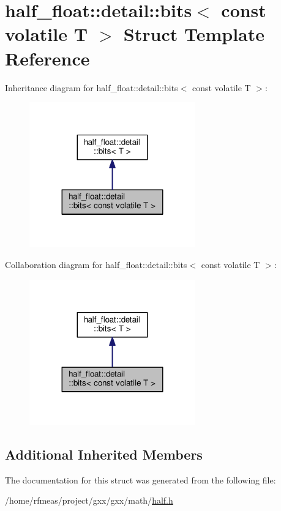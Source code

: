 \hypertarget{structhalf__float_1_1detail_1_1bits_3_01const_01volatile_01T_01_4}{}\section{half\+\_\+float\+:\+:detail\+:\+:bits$<$ const volatile T $>$ Struct Template Reference}
\label{structhalf__float_1_1detail_1_1bits_3_01const_01volatile_01T_01_4}


Inheritance diagram for half\+\_\+float\+:\+:detail\+:\+:bits$<$ const volatile T $>$\+:
\nopagebreak
\begin{figure}[H]
\begin{center}
\leavevmode
\includegraphics[width=203pt]{structhalf__float_1_1detail_1_1bits_3_01const_01volatile_01T_01_4__inherit__graph}
\end{center}
\end{figure}


Collaboration diagram for half\+\_\+float\+:\+:detail\+:\+:bits$<$ const volatile T $>$\+:
\nopagebreak
\begin{figure}[H]
\begin{center}
\leavevmode
\includegraphics[width=203pt]{structhalf__float_1_1detail_1_1bits_3_01const_01volatile_01T_01_4__coll__graph}
\end{center}
\end{figure}
\subsection*{Additional Inherited Members}


The documentation for this struct was generated from the following file\+:\begin{DoxyCompactItemize}
\item 
/home/rfmeas/project/gxx/gxx/math/\hyperlink{half_8h}{half.\+h}\end{DoxyCompactItemize}
